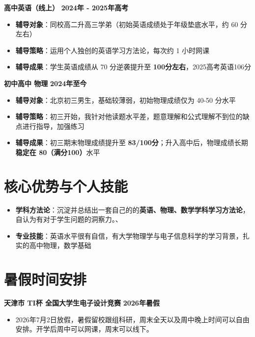 \documentclass[10pt,a4paper]{article}
\begin{document}
\textbf{高中英语（线上）} \hfill \textbf{2024年 - 2025年高考} \\
\begin{itemize}[leftmargin=15pt, topsep=2pt, itemsep=0pt]
    \item \textbf{辅导对象}：同校高二升高三学弟（初始英语成绩处于年级垫底水平，约 60 分左右）
    \item \textbf{辅导策略}：运用个人独创的英语学习方法论，每次约 1 小时网课
    \item \textbf{辅导成果}：学生英语成绩从 70 分逆袭提升至 \textbf{100分左右}，2025高考英语106分
\end{itemize}

\textbf{初中高中 物理 } \hfill \textbf{2024年至今} \\

\begin{itemize}[leftmargin=15pt, topsep=2pt, itemsep=0pt]
    \item \textbf{辅导对象}：北京初三男生，基础较薄弱，初始物理成绩仅为 40-50 分水平
    \item \textbf{辅导策略}：初三开始，我针对他读题水平差，题意理解和公式理解不到位的缺点进行指导，加强练习
    \item \textbf{辅导成果}：初三期末物理成绩提升至 \textbf{83/100分}；升入高中后，物理成绩长期\textbf{稳定在 80（满分100）}水平
\end{itemize}


\section{核心优势与个人技能}
\begin{itemize}[leftmargin=15pt, topsep=2pt, itemsep=2pt]
    \item \textbf{学科方法论}：沉淀并总结出一套自己的的\textbf{英语、物理、数学学科学习方法论}，自认为有对于学生问题的洞察力。、
    \item \textbf{专业技能}：英语水平很有自信，有大学物理学与电子信息科学的学习背景，扎实的高中物理，数学基础
\end{itemize}

\section{暑假时间安排}
\textbf{天津市 TI杯 全国大学生电子设计竞赛} \hfill \textbf{2026年暑假} \\
\begin{itemize}[leftmargin=15pt, topsep=2pt, itemsep=0pt]
    \item 2026年7月2日放假，暑假留校跟组科研，周末全天以及周中晚上时间可以自由安排。开学后周中可以网课，周末可以线下。
\end{itemize}
\end{document}

